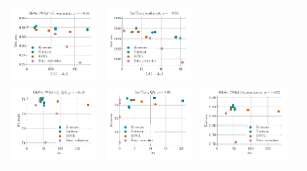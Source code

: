 \begin{figure}
\begin{tabular}{@{\hskip -0.0in}c@{\hskip -0.0in}c@{\hskip -0.0in}c@{\hskip -0.0in}c@{\hskip -0.0in}}
		\includegraphics[width=.245\linewidth]{figures/glove400k_sentiment_sst_test-acc_vs_gram-large-dim-delta1-2-trans_linx_det_ave-pt.pdf} &
		\includegraphics[width=.245\linewidth]{figures/fasttext1m_sentiment_sst_test-acc_vs_gram-large-dim-delta1-2-trans_linx_det_ave-pt.pdf} \\
		\includegraphics[width=.245\linewidth]{figures/glove400k_qa_best-f1_vs_gram-large-dim-delta2-2_linx_det_ave-pt.pdf} &
		\includegraphics[width=.245\linewidth]{figures/fasttext1m_qa_best-f1_vs_gram-large-dim-delta2-2_linx_det_ave-pt.pdf} &
		\includegraphics[width=.245\linewidth]{figures/glove400k_sentiment_sst_test-acc_vs_gram-large-dim-delta2-2_linx_det_ave-pt.pdf} &

\end{tabular}
\end{figure}
